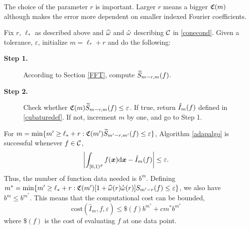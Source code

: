 \documentclass[graybox]{svmult}
\newcommand{\bsx}{\boldsymbol{x}}    %
\begin{document}
The choice of the parameter $r$ is important. Larger $r$ means a bigger $\mathfrak{C}(m)$ although makes the error more dependent on smaller indexed Fourier coefficients.

\begin{algo} \label{adapalgo} Fix $r$, $\ell_*$ as described above and $\widehat{\omega}$ and $\mathring{\omega}$ describing $\mathcal{C}$ in \eqref{conecond}. Given a tolerance, $\varepsilon$, initialize $m=\ell_*+r$ and do the following:

\begin{description}
\item[\textbf{Step 1.}] According to Section \ref{FFT}, compute $\widetilde{S}_{m-r,m}(f)$.
\item[\textbf{Step 2.}] Check whether $\mathfrak{C}(m)  \widetilde{S}_{m-r,m}(f) \le \varepsilon$. If true, return $\hat{I}_m(f)$ defined in \eqref{cubaturedef}. If not, increment $m$ by one, and go to Step 1.
\end{description}
\end{algo}

\begin{theorem} \label{adapalgothm} For $m = \min \{m' \ge \ell_*+r : \mathfrak{C}(m')  \widetilde{S}_{m'-r,m'}(f) \le \varepsilon \}$, Algorithm \ref{adapalgo} is successful whenever $f\in\mathcal{C}$,
\[
\biggabs{\int_{\cube} f(\bsx) \D \bsx - \hI_m(f)} \le \varepsilon.
\]
Thus, the number of function data needed is $b^m$. Defining $m^* = \min \{m' \ge \ell_*+r : \mathfrak{C}(m') [1+ \widehat{\omega}(r) \mathring{\omega}(r)] S_{m'-r}(f) \le \varepsilon \}$, we also have $b^m\leq b^{m^*}$. This means that the computational cost can be bounded,
\[
\mathrm{cost}\left(\widehat{I}_m,f,\varepsilon\right)\leq \$(f)b^{m^*}+cm^*b^{m^*}
\]
where $\$(f)$ is the cost of evaluating $f$ at one data point.
\end{theorem}
\end{document}
